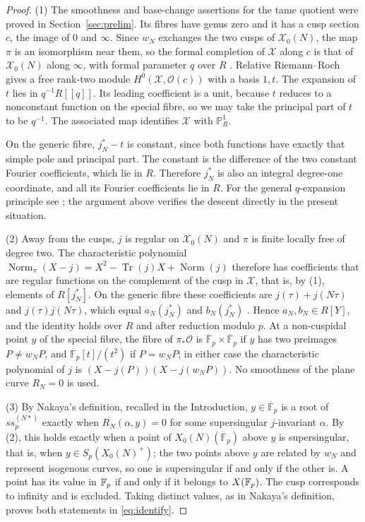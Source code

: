 \documentclass[11pt,a4paper]{article}
\theoremstyle{remark}\newtheorem{remark}[theorem]{Remark}
\numberwithin{equation}{section}
\newcommand{\kk}{\overline{\mathbb F}_p}
\begin{document}
	\begin{proof}
		(1) The smoothness and base-change assertions for the tame quotient were proved in Section~\ref{sec:prelim}. Its fibres have genus zero and it has a cusp section $c$, the image of $0$ and $\infty$. Since $w_N$ exchanges the two cusps of $\mathscr X_0(N)$, the map $\pi$ is an isomorphism near them, so the formal completion of $\mathscr X$ along $c$ is that of $\mathscr X_0(N)$ along $\infty$, with formal parameter $q$ over $R$ \cite[VII]{DR}. Relative Riemann--Roch gives a free rank-two module $H^0(\mathscr X,\mathcal O(c))$ with a basis $1,t$. The expansion of $t$ lies in $q^{-1}R[[q]]$. Its leading coefficient is a unit, because $t$ reduces to a nonconstant function on the special fibre, so we may take the principal part of $t$ to be $q^{-1}$. The associated map identifies $\mathscr X$ with $\mathbb P^1_R$.
		
		On the generic fibre, $j_N^*-t$ is constant, since both functions have exactly that simple pole and principal part. The constant is the difference of the two constant Fourier coefficients, which lie in $R$. Therefore $j_N^*$ is also an integral degree-one coordinate, and all its Fourier coefficients lie in $R$. For the general $q$-expansion principle see \cite[VII, Theorem 3.9]{DR}; the argument above verifies the descent directly in the present situation.
		
		(2) Away from the cusps, $j$ is regular on $\mathscr X_0(N)$ and $\pi$ is finite locally free of degree two. The characteristic polynomial $\operatorname{Norm}_\pi(X-j)=X^2-\operatorname{Tr}(j)X+\operatorname{Norm}(j)$ therefore has coefficients that are regular functions on the complement of the cusp in $\mathscr X$, that is, by (1), elements of $R[j_N^*]$. On the generic fibre these coefficients are $j(\tau)+j(N\tau)$ and $j(\tau)j(N\tau)$, which equal $a_N(j_N^*)$ and $b_N(j_N^*)$ \cite[Proposition~4]{Nakaya}. Hence $a_N,b_N\in R[Y]$, and the identity holds over $R$ and after reduction modulo $p$. At a non-cuspidal point $y$ of the special fibre, the fibre of $\pi_*\mathcal O$ is $\kk\times\kk$ if $y$ has two preimages $P\neq w_NP$, and $\kk[t]/(t^2)$ if $P=w_NP$; in either case the characteristic polynomial of $j$ is $(X-j(P))(X-j(w_NP))$. No smoothness of the plane curve $R_N=0$ is used.
		
		(3) By Nakaya's definition, recalled in the Introduction, $y\in\kk$ is a root of $ss_p^{(N*)}$ exactly when $\overline{R_N}(\alpha,y)=0$ for some supersingular $j$-invariant $\alpha$. By (2), this holds exactly when a point of $X_0(N)(\kk)$ above $y$ is supersingular, that is, when $y\in S_p(X_0(N)^+)$; the two points above $y$ are related by $w_N$ and represent isogenous curves, so one is supersingular if and only if the other is. A point has its value in $\mathbb F_p$ if and only if it belongs to $X(\mathbb F_p)$. The cusp corresponds to infinity and is excluded. Taking distinct values, as in Nakaya's definition, proves both statements in \eqref{eq:identify}.
	\end{proof}
	
\end{document}
